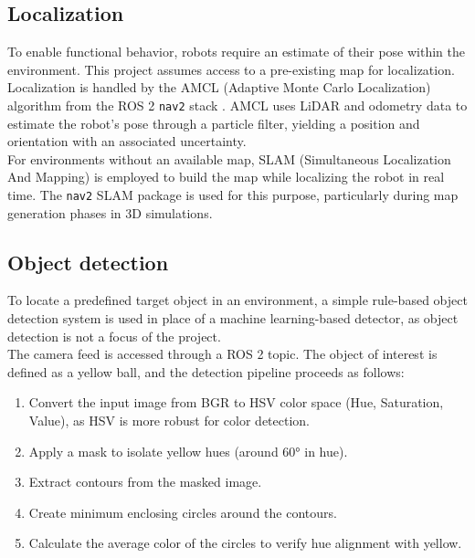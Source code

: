 \subsection{Localization}
\label{sub:localization} 
To enable functional behavior, robots require an estimate of their pose within the environment. This project assumes access to a pre-existing map for localization. \\

Localization is handled by the AMCL (Adaptive Monte Carlo Localization) algorithm \cite{amcl, amcl-docs} from the ROS 2 \texttt{nav2} stack \cite{nav2, nav2-docs}. AMCL uses LiDAR and odometry data to estimate the robot’s pose through a particle filter, yielding a position and orientation with an associated uncertainty.\\

For environments without an available map, SLAM (Simultaneous Localization And Mapping) is employed to build the map while localizing the robot in real time. The \texttt{nav2} SLAM package is used for this purpose, particularly during map generation phases in 3D simulations.

\subsection{Object detection}
\label{sub:object_detection}
To locate a predefined target object in an environment, a simple rule-based object detection system is used in place of a machine learning-based detector, as object detection is not a focus of the project. \\

The camera feed is accessed through a ROS 2 topic. The object of interest is defined as a yellow ball, and the detection pipeline proceeds as follows:

\begin{enumerate}
    \item Convert the input image from BGR to HSV color space (Hue, Saturation, Value), as HSV is more robust for color detection.
    \item Apply a mask to isolate yellow hues (around 60° in hue).
    \item Extract contours from the masked image.
    \item Create minimum enclosing circles around the contours.
    \item Calculate the average color of the circles to verify hue alignment with yellow.
\end{enumerate}


